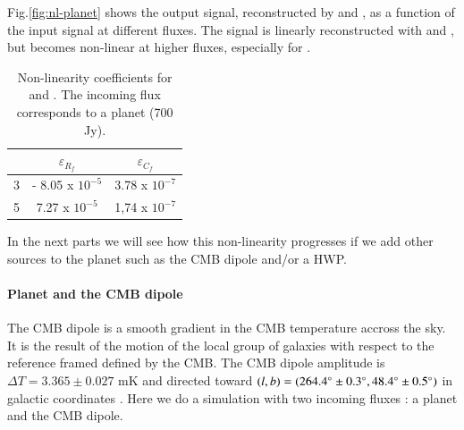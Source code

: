 Fig.\ref{fig:nl-planet} shows the output signal, reconstructed by \rf and \cf, as a function of the input signal at different fluxes. The signal is linearly reconstructed with \rf and \cf, but becomes non-linear at higher fluxes, especially for \rf.  \\

 \begin{table}[h!]
\center
	\begin{tabular}{|c|c|c|}
  	\hline
 	\backslashbox{$npts/fwhm$}{$\varepsilon$} & $	\varepsilon_{R_{f}}$ & $\varepsilon_{C_{f}} $ \\
	\hline
 	3  & - 8.05 x $10^{-5}$ & 3.78 x $10^{-7}$ \\
  	\hline
 	5 & 7.27 x $10^{-5}$ & 1,74 x $10^{-7}$ \\
  	\hline
	\end{tabular} 
\caption{Non-linearity coefficients \eps for \rf and \cf. The incoming flux corresponds to a planet (700 Jy).}
\label{tab:eps-planet}
\end{table} 

In the next parts we will see how this non-linearity progresses if we add other sources to the planet such as the CMB dipole and/or a HWP.

\paragraph{Planet and the CMB dipole \\}

The CMB dipole is a smooth gradient in the CMB temperature accross the sky. It is the result of the motion of the local group of galaxies with respect to the reference framed defined by the CMB. The CMB dipole amplitude is $\Delta T = 3.365 \pm 0.027$ mK and directed toward $(l,b) = (264.4 \degree \pm 0.3 \degree , 48.4 \degree \pm 0.5 \degree)$ in galactic coordinates \citep{2015IJMPD..2430004B}. Here we do a simulation with two incoming fluxes : a planet and the CMB dipole. 


